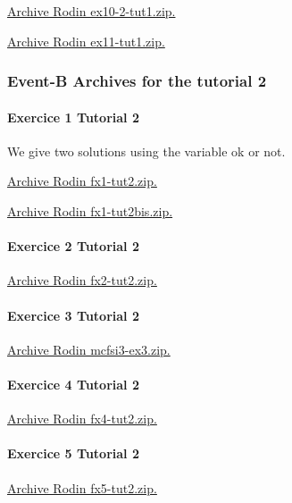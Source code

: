 \documentclass[ 12pt]{article}
\begin{document}
\href{http://mery54.github.io/teaching/mosos/models/ex10-2-tut1.zip}{Archive 
  Rodin   ex10-2-tut1.zip.}



\href{http://mery54.github.io/teaching/mosos/models/ex11-tut1.zip}{Archive 
  Rodin   ex11-tut1.zip.}



 \subsubsection{Event-B Archives for   the tutorial 2}
\label{sec:event-b-archives}

\paragraph{Exercice 1 Tutorial 2}

We give  two solutions using  the variable ok or not.


\href{http://mery54.github.io/teaching/mosos/models/fx1-tut2.zip}{Archive 
  Rodin   fx1-tut2.zip.}


\href{http://mery54.github.io/teaching/mosos/models/fx1-tut2.zip}{Archive 
  Rodin   fx1-tut2bis.zip.}


\paragraph{Exercice 2 Tutorial 2}



\href{http://mery54.github.io/teaching/mosos/models/fx2-tut2.zip}{Archive 
  Rodin   fx2-tut2.zip.}


\paragraph{Exercice 3 Tutorial 2}
\href{http://mery54.github.io/teaching/mosos/models/mcfsi3-ex3.zip}{Archive 
  Rodin  mcfsi3-ex3.zip.}



\paragraph{Exercice 4 Tutorial 2}
\href{http://mery54.github.io/teaching/mosos/models/fx4-tut2.zip}{Archive 
  Rodin   fx4-tut2.zip.}




\paragraph{Exercice 5 Tutorial 2}
\href{http://mery54.github.io/teaching/mosos/models/fx5-tut2.zip}{Archive 
  Rodin   fx5-tut2.zip.}
\end{document}
